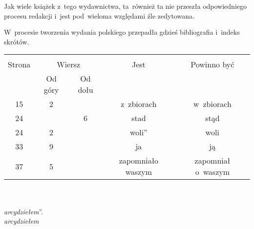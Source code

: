 \documentclass[a4paper,11pt]{article}
\begin{document}



\start Jak wiele książek z~tego wydawnictwa, ta~również ta nie
przeszła odpowiedniego procesu redakcji i~jest pod~wieloma względami
źle zedytowana.

\vspace{\spaceFour}


\start W~procesie tworzenia wydania polskiego przepadła gdzieś
bibliografia i~indeks skrótów.

\begin{center}

  \begin{tabular}{|c|c|c|c|c|}
    \hline
    & \multicolumn{2}{c|}{} & & \\
    Strona & \multicolumn{2}{c|}{Wiersz} & Jest
                              & Powinno być \\ \cline{2-3}
    & Od góry & Od dołu & & \\
    \hline
    15  &  2 & & z~zbiorach & w~zbiorach \\
    24  & &  6 & stad & stąd \\
    24  &  2 & & woli” & woli \\
    33  &  9 & & ja & ją \\
    37  &  5 & & zapomniało waszym & zapomniał o~waszym \\
    \hline
  \end{tabular}

\end{center}
\noindent\\
 \\
\Jest  \emph{arcydziełem}”. \\
\Powin \emph{arcydziełem} \\

\vspace{\spaceTwo}







\end{document}
